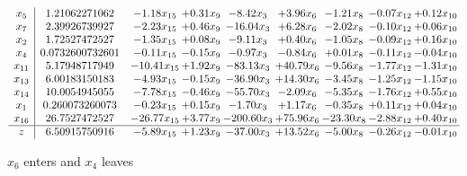 \documentclass[9pt]{article}
\begin{document}
 \[\begin{array}{c| c c@{\hskip 2pt} c@{\hskip 2pt} c@{\hskip 2pt} c@{\hskip 2pt} c@{\hskip 2pt} c@{\hskip 2pt} c@{\hskip 2pt} }
 x_{5}   &  1.21062271062 & -1.18 x_{15} & +  0.31 x_{9} & -8.42 x_{3} & +  3.96 x_{6} & -1.21 x_{8} & -0.07 x_{12} & +  0.12 x_{10}\\
 x_{7}   &  2.39926739927 & -2.23 x_{15} & +  0.46 x_{9} & -16.04 x_{3} & +  6.28 x_{6} & -2.02 x_{8} & -0.10 x_{12} & +  0.06 x_{10}\\
 x_{2}   &  1.72527472527 & -1.35 x_{15} & +  0.08 x_{9} & -9.11 x_{3} & +  0.40 x_{6} & -1.05 x_{8} & -0.09 x_{12} & +  0.16 x_{10}\\
 x_{4}   &  0.0732600732601 & -0.11 x_{15} & -0.15 x_{9} & -0.97 x_{3} & -0.84 x_{6} & +  0.01 x_{8} & -0.11 x_{12} & -0.04 x_{10}\\
 x_{11}   &  5.17948717949 & -10.41 x_{15} & +  1.92 x_{9} & -83.13 x_{3} & + 40.79 x_{6} & -9.56 x_{8} & -1.77 x_{12} & -1.31 x_{10}\\
 x_{13}   &  6.00183150183 & -4.93 x_{15} & -0.15 x_{9} & -36.90 x_{3} & + 14.30 x_{6} & -3.45 x_{8} & -1.25 x_{12} & -1.15 x_{10}\\
 x_{14}   &  10.0054945055 & -7.78 x_{15} & -0.46 x_{9} & -55.70 x_{3} & -2.09 x_{6} & -5.35 x_{8} & -1.76 x_{12} & +  0.55 x_{10}\\
 x_{1}   &  0.260073260073 & -0.23 x_{15} & +  0.15 x_{9} & -1.70 x_{3} & +  1.17 x_{6} & -0.35 x_{8} & +  0.11 x_{12} & +  0.04 x_{10}\\
 x_{16}   &  26.7527472527 & -26.77 x_{15} & +  3.77 x_{9} & -200.60 x_{3} & + 75.96 x_{6} & -23.30 x_{8} & -2.88 x_{12} & +  0.40 x_{10}\\
\hline
z    &  6.50915750916 & -5.89 x_{15} & +  1.23 x_{9} & -37.00 x_{3} & + 13.52 x_{6} & -5.00 x_{8} & -0.26 x_{12} & -0.01 x_{10}\\
\end{array}\]


 $ x_{6} $ enters and $ x_{4} $ leaves 
\end{document}
